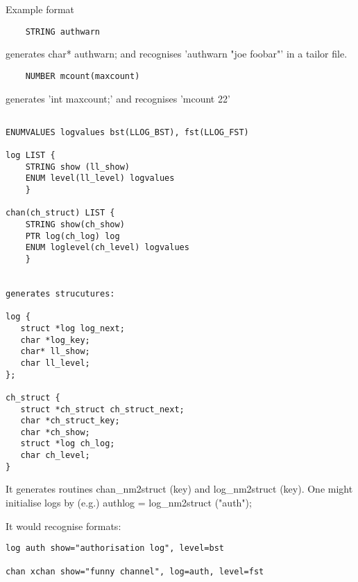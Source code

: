 Example format

\begin {verbatim}
	STRING authwarn
\end{verbatim}


generates char* authwarn; and recognises 'authwarn "joe foobar"' in a tailor
file.

\begin {verbatim}
	NUMBER mcount(maxcount)
\end{verbatim}

generates 'int maxcount;' and recognises 'mcount 22'

\begin {verbatim}

ENUMVALUES logvalues bst(LLOG_BST), fst(LLOG_FST)

log LIST {
    STRING show (ll_show) 
    ENUM level(ll_level) logvalues
    }
    
chan(ch_struct) LIST {
    STRING show(ch_show) 
    PTR log(ch_log) log
    ENUM loglevel(ch_level) logvalues
    }


generates strucutures:

log {
   struct *log log_next;
   char *log_key;
   char* ll_show;
   char ll_level;
};

ch_struct {
   struct *ch_struct ch_struct_next;
   char *ch_struct_key;
   char *ch_show;
   struct *log ch_log;
   char ch_level;
}
\end{verbatim}

It generates routines chan\_nm2struct (key) and log\_nm2struct (key).
One might initialise logs by (e.g.) authlog = log\_nm2struct ("auth");

It would recognise formats:

\begin {verbatim}
log auth show="authorisation log", level=bst

chan xchan show="funny channel", log=auth, level=fst
\end{verbatim}



